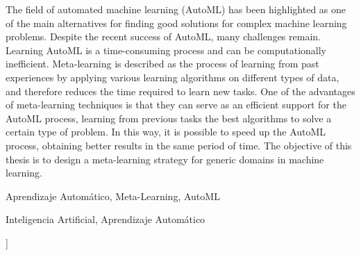 \documentclass[a4paper,10pt,twocolumn]{article}
\begin{document}
\begin{enabstract}
	The field of automated machine learning (AutoML) has been highlighted as one of the main alternatives for finding good solutions for complex machine learning problems. Despite the recent success of AutoML, many challenges remain. Learning AutoML is a time-consuming process and can be computationally inefficient. Meta-learning is described as the process of learning from past experiences by applying various learning algorithms on different types of data, and therefore reduces the time required to learn new tasks. One of the advantages of meta-learning techniques is that they can serve as an efficient support for the AutoML process, learning from previous tasks the best algorithms to solve a certain type of problem. In this way, it is possible to speed up the AutoML process, obtaining better results in the same period of time. The objective of this thesis is to design a meta-learning strategy for generic domains in machine learning.

\end{enabstract}

\begin{keywords}
	Aprendizaje Automático, Meta-Learning, AutoML
\end{keywords}

\begin{topics}
	Inteligencia Artificial, Aprendizaje Automático
\end{topics}


\vspace{0.8cm}
]



\end{document}
